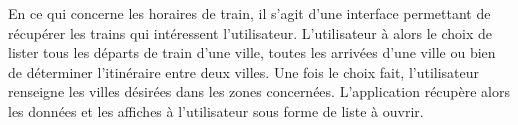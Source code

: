 En ce qui concerne les horaires de train, il s'agit d'une interface permettant de récupérer les trains qui intéressent l'utilisateur. L'utilisateur à alors le choix de lister tous les départs de train d'une ville, toutes les arrivées d'une ville ou bien de déterminer l'itinéraire entre deux villes. Une fois le choix fait, l'utilisateur renseigne les villes désirées dans les zones concernées. L'application récupère alors les données et les affiches à l'utilisateur sous forme de liste à ouvrir.



